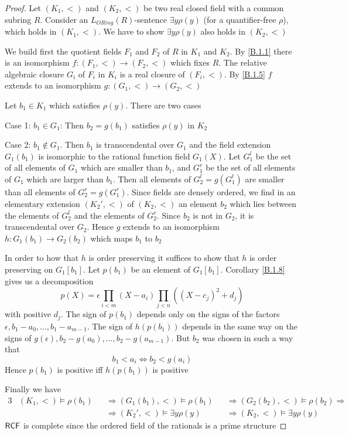 \documentclass[11pt]{article}
\begin{document}
\begin{proof}
Let \((K_1,<)\) and \((K_2,<)\) be two real closed field with a common subring \(R\). Consider
an \(L_{ORing}(R)\)-sentence \(\exists y\rho(y)\) (for a quantifier-free \(\rho\)), which holds in \((K_1,<)\).
We have to show \(\exists y\rho(y)\) also holds in \((K_2,<)\)

We build first the quotient fields \(F_1\) and \(F_2\) of \(R\) in \(K_1\) and \(K_2\). By \ref{B.1.1}
there is an isomorphism \(f:(F_1,<)\to(F_2,<)\) which fixes \(R\). The relative algebraic
closure \(G_i\) of \(F_i\) in \(K_i\) is a real closure of \((F_i,<)\). By \ref{B.1.5} \(f\) extends to
an isomorphism \(g:(G_1,<)\to(G_2,<)\)

Let \(b_1\in K_1\) which satisfies \(\rho(y)\). There are two cases

Case 1: \(b_1\in G_1\): Then \(b_2=g(b_1)\) satisfies \(\rho(y)\) in \(K_2\)

Case 2: \(b_1\not\in G_1\). Then \(b_1\) is transcendental over \(G_1\) and the field
extension \(G_1(b_1)\) is isomorphic to the rational function field \(G_1(X)\). Let \(G_1^l\) be the
set of all elements of \(G_1\) which are smaller than \(b_1\), and \(G_1^r\) be the set of all
elements of \(G_1\) which are larger than \(b_1\). Then all elements of \(G_2^l=g(G_1^l)\) are smaller
than all elements of \(G_2^r=g(G_1^r)\). Since fields are densely ordered, we find in an elementary
extension \((K_2',<)\) of \((K_2,<)\) an element \(b_2\) which lies between the elements of \(G_2^l\)
and the elements of \(G_2^r\). Since \(b_2\) is not in \(G_2\), it is transcendental over \(G_2\).
Hence \(g\) extends to an isomorphism \(h:G_1(b_1)\to G_2(b_2)\) which maps \(b_1\) to \(b_2\)

In order to how that \(h\) is order preserving it suffices to show that \(h\) is order preserving
on \(G_1[b_1]\). Let \(p(b_1)\) be an element of \(G_1[b_1]\). Corollary \ref{B.1.8} gives us a
decomposition
\begin{equation*}
p(X)=\epsilon\prod_{i<m}(X-a_i)\prod_{j<n}((X-c_j)^2+d_j)
\end{equation*}
with positive \(d_j\). The sign of \(p(b_1)\) depends only on the signs of the factors
\(\epsilon,b_1-a_0,\dots,b_1-a_{m-1}\). The sign of \(h(p(b_1))\) depends in the same way on the signs
of \(g(\epsilon),b_2-g(a_0),\dots,b_2-g(a_{m-1})\). But \(b_2\) was chosen in such a way that
\begin{equation*}
b_1<a_i\Longleftrightarrow b_2<g(a_i)
\end{equation*}
Hence \(p(b_1)\) is positive iff \(h(p(b_1))\) is positive

Finally we have
\begin{alignat*}{3}
&(K_1,<)\vDash\rho(b_1)&&\Rightarrow (G_1(b_1),<)\vDash\rho(b_1)&&\Rightarrow(G_2(b_2),<)\vDash\rho(b_2)\Rightarrow\\
&&&\Rightarrow(K_2',<)\vDash\exists y\rho(y)&&\Rightarrow(K_2,<)\vDash\exists y\rho(y)
\end{alignat*}
\(\textsf{RCF}\) is complete since the ordered field of the rationals is a prime structure
\end{proof}
\end{document}
